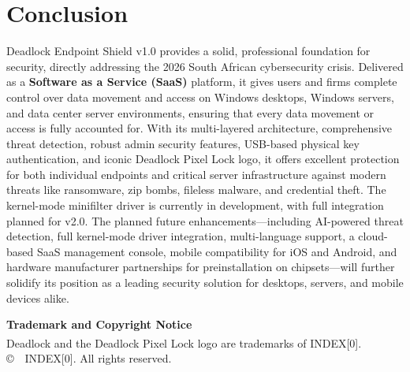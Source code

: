 \documentclass[12pt,letterpaper]{report}
\begin{document}
\chapter{Conclusion}
Deadlock Endpoint Shield v1.0 provides a solid, professional foundation for security, directly addressing the 2026 South African cybersecurity crisis. Delivered as a \textbf{Software as a Service (SaaS)} platform, it gives users and firms complete control over data movement and access on Windows desktops, Windows servers, and data center server environments, ensuring that every data movement or access is fully accounted for. With its multi-layered architecture, comprehensive threat detection, robust admin security features, USB-based physical key authentication, and iconic Deadlock Pixel Lock logo, it offers excellent protection for both individual endpoints and critical server infrastructure against modern threats like ransomware, zip bombs, fileless malware, and credential theft. The kernel-mode minifilter driver is currently in development, with full integration planned for v2.0. The planned future enhancements---including AI-powered threat detection, full kernel-mode driver integration, multi-language support, a cloud-based SaaS management console, mobile compatibility for iOS and Android, and hardware manufacturer partnerships for preinstallation on chipsets---will further solidify its position as a leading security solution for desktops, servers, and mobile devices alike.

\vfill
\begin{center}
    \Large \textbf{Trademark and Copyright Notice} \\
    \vspace{0.3cm}
    \normalsize
    Deadlock\textsuperscript{\textregistered} and the Deadlock Pixel Lock logo are trademarks of INDEX[0]. \\
    \vspace{0.2cm}
    \copyright\ \the\year\ INDEX[0]. All rights reserved.
\end{center}
\end{document}
